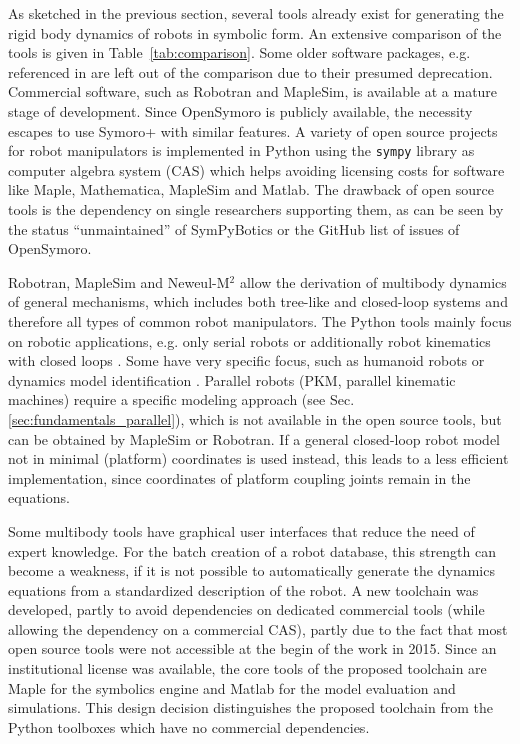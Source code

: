 \documentclass[runningheads]{llncs}
\begin{document}
As sketched in the previous section, several tools already exist for generating the rigid body dynamics of robots in symbolic form.
An extensive comparison of the tools is given in Table~\ref{tab:comparison}.
Some older software packages, e.g. referenced in \cite{SousaCor2012} are left out of the comparison due to their presumed deprecation.
Commercial software, such as Robotran and MapleSim, is available at a mature stage of development.
Since OpenSymoro is publicly available, the necessity escapes to use Symoro+ with similar features. %
A variety of open source projects for robot manipulators is implemented in Python using the \texttt{sympy} library as computer algebra system (CAS) which helps avoiding licensing costs for software like Maple, Mathematica, MapleSim and Matlab.
The drawback of open source tools is the dependency on single researchers supporting them, as can be seen by the status ``unmaintained'' of SymPyBotics or the GitHub list of issues of OpenSymoro.

Robotran, MapleSim and Neweul-M$^2$ allow the derivation of multibody dynamics of general mechanisms, which includes both tree-like and closed-loop systems and therefore all types of common robot manipulators.
The Python tools mainly focus on robotic applications, e.g. only serial robots \cite{SousaCor2012} or additionally robot kinematics with closed loops \cite{KhalilVijKhoMuk2014,WangGonMunFis2019}.
Some have very specific focus, such as humanoid robots \cite{BethgeMalTsaCal2017} or dynamics model identification \cite{WangGonMunFis2019,BethgeMalTsaCal2017}.
Parallel robots (PKM, parallel kinematic machines) require a specific modeling approach (see Sec.\,\ref{sec:fundamentals_parallel}), which is not available in the open source tools, but can be obtained by MapleSim or Robotran.
If a general closed-loop robot model not in minimal (platform) coordinates is used instead, this leads to a less efficient implementation, since coordinates of platform coupling joints remain in the equations. %

Some multibody tools have graphical user interfaces that reduce the need of expert knowledge.
For the batch creation of a robot database, this strength can become a weakness, if it is not possible to automatically generate the dynamics equations from a standardized description of the robot.
A new toolchain was developed, partly to avoid dependencies on dedicated commercial tools (while allowing the dependency on a commercial CAS), partly due to the fact that most open source tools were not accessible at the begin of the work in 2015.
Since an institutional license was available, the core tools of the proposed toolchain are Maple for the symbolics engine and Matlab for the model evaluation and simulations.
This design decision distinguishes the proposed toolchain from the Python toolboxes which have no commercial dependencies. %
\end{document}
